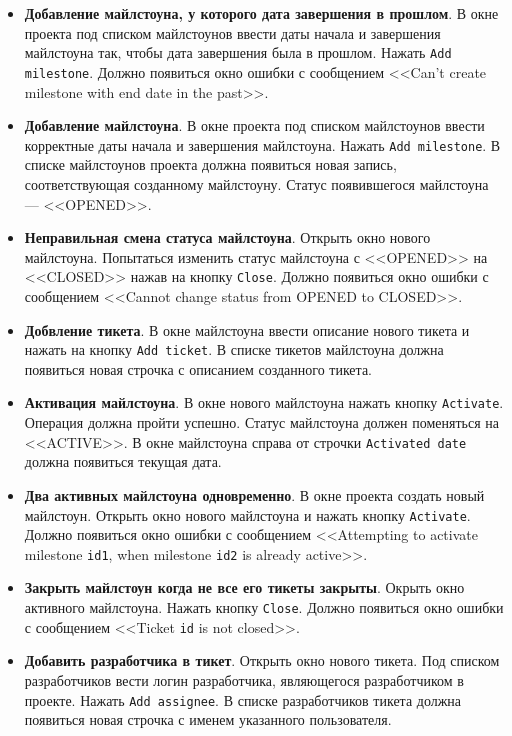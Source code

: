 \begin{itemize}
\item \textbf{Добавление майлстоуна, у которого дата завершения в прошлом}. В окне проекта под списком майлстоунов ввести даты начала и завершения майлстоуна так, чтобы дата завершения была в прошлом. Нажать \texttt{Add milestone}. Должно появиться окно ошибки с сообщением <<Can't create milestone with end date in the past>>.

\item \textbf{Добавление майлстоуна}. В окне проекта под списком майлстоунов ввести корректные даты начала и завершения майлстоуна. Нажать \texttt{Add milestone}. В списке майлстоунов проекта должна появиться новая запись, соответствующая созданному майлстоуну. Статус появившегося майлстоуна --- <<OPENED>>.

\item \textbf{Неправильная смена статуса майлстоуна}. Открыть окно нового майлстоуна. Попытаться изменить статус майлстоуна с <<OPENED>> на <<CLOSED>> нажав на кнопку \texttt{Close}. Должно появиться окно ошибки с сообщением <<Cannot change status from OPENED to CLOSED>>.

\item \textbf{Добвление тикета}. В окне майлстоуна ввести описание нового тикета и нажать на кнопку \texttt{Add ticket}. В списке тикетов майлстоуна должна появиться новая строчка с описанием созданного тикета.

\item \textbf{Активация майлстоуна}. В окне нового майлстоуна нажать кнопку \texttt{Activate}. Операция должна пройти успешно. Статус майлстоуна должен поменяться на <<ACTIVE>>. В окне майлстоуна справа от строчки \texttt{Activated date} должна появиться текущая дата.

\item \textbf{Два активных майлстоуна одновременно}. В окне проекта создать новый майлстоун. Открыть окно нового майлстоуна и нажать кнопку \texttt{Activate}. Должно появиться окно ошибки с сообщением <<Attempting to activate milestone \texttt{id1}, when milestone \texttt{id2} is already active>>.

\item \textbf{Закрыть майлстоун когда не все его тикеты закрыты}. Окрыть окно активного майлстоуна. Нажать кнопку \texttt{Close}. Должно появиться окно ошибки с сообщением <<Ticket \texttt{id} is not closed>>.

\item \textbf{Добавить разработчика в тикет}. Открыть окно нового тикета. Под списком разработчиков вести логин разработчика, являющегося разработчиком в проекте. Нажать \texttt{Add assignee}. В списке разработчиков тикета должна появиться новая строчка с именем указанного пользователя.


\end{itemize}
